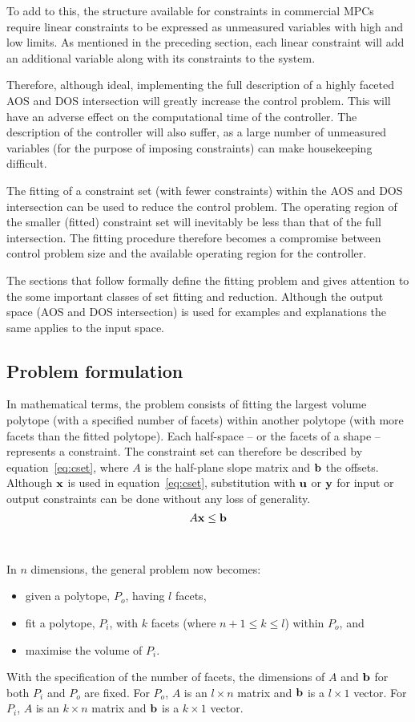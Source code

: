 To add to this, the structure available for constraints in commercial MPCs require linear constraints to be expressed as unmeasured variables with high and low limits.
As mentioned in the preceding section, each linear constraint will add an additional variable along with its constraints to the system.

Therefore, although ideal, implementing the full description of a highly faceted AOS and DOS intersection will greatly increase the control problem.
This will have an adverse effect on the computational time of the controller.
The description of the controller will also suffer, as a large number of unmeasured variables (for the purpose of imposing constraints) can make housekeeping difficult.

The fitting of a constraint set (with fewer constraints) within the AOS and DOS intersection can be used to reduce the control problem.
The operating region of the smaller (fitted) constraint set will inevitably be less than that of the full intersection.
The fitting procedure therefore becomes a compromise between control problem size and the available operating region for the controller.

The sections that follow formally define the fitting problem and gives attention to the some important classes of set fitting and reduction.
Although the output space (AOS and DOS intersection) is used for examples and explanations the same applies to the input space.

\subsection{Problem formulation}
In mathematical terms, the problem consists of fitting the largest volume polytope (with a specified number of facets) within another polytope (with more facets than the fitted polytope).
Each half-space -- or the facets of a shape -- represents a constraint.
The constraint set can therefore be described by equation~\ref{eq:cset}, where $A$ is the half-plane slope matrix and ${\bf {b}}$ the offsets.
Although ${\bf {x}}$ is used in equation~\ref{eq:cset}, substitution with ${\bf {u}}$ or ${\bf {y}}$ for input or output constraints can be done without any loss of generality.
\begin{equation}
  \label{eq:cset}
  A{\bf {x}} \leq {\bf {b}}
\end{equation}
\\\\
In $n$ dimensions, the general problem now becomes: 
\begin{itemize}
  \item given a polytope, $P_o$, having $l$ facets,
  \item fit a polytope, $P_i$, with $k$ facets (where $n+1 \leq k \le l$) within $P_o$, and
  \item maximise the volume of $P_i$.
\end{itemize} 
With the specification of the number of facets, the dimensions of $A$ and ${\bf {b}}$ for both $P_i$ and $P_o$ are fixed.
For $P_o$, $A$ is an $l \times n$ matrix and ${\bf {b}}$ is a $l \times 1$ vector.
For $P_i$, $A$ is an $k \times n$ matrix and ${\bf {b}}$ is a $k \times 1$ vector.

